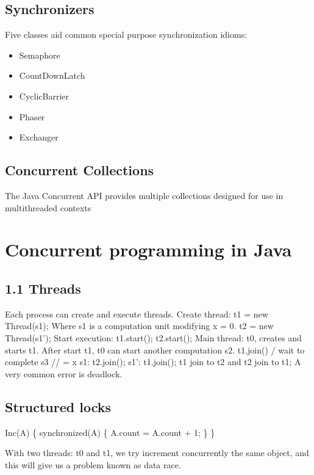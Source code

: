 \documentclass[openany, a4paper]{book}
\theoremstyle{break}
\theoremstyle{example}
\theoremstyle{note}
\theoremstyle{break}
\theoremstyle{exercise}
\begin{document}
\section{Synchronizers}
\label{sec:org6d54f78}

Five classes aid common special purpose synchronization idioms:

\begin{itemize}
\item Semaphore
\item CountDownLatch
\item CyclicBarrier
\item Phaser
\item Exchanger
\end{itemize}

\section{Concurrent Collections}
\label{sec:org3882d62}

The Java Concurrent API provides multiple collections designed for use in
multithreaded contexts


\chapter{Concurrent programming in Java}
\label{sec:org709268f}

\section{1.1 Threads}
\label{sec:org885425f}
Each process can create and execute threads.
Create thread: t1 = new Thread(s1); Where s1 is a computation unit modifying x
= 0.
t2 = new Thread(s1');
Start execution: t1.start(); t2.start();
Main thread: t0, creates and starts t1. After start t1, t0 can start another
computation s2.
t1.join() / wait to complete
s3 // = x
s1: t2.join();
s1': t1.join();
t1 join to t2 and t2 join to t1;
A very common error is deadlock.

\section{Structured locks}
\label{sec:org769ddf0}

Inc(A) \{
  synchronized(A) \{
    A.count = A.count + 1;
  \}
\}

With two threads: t0 and t1, we try increment concurrently the same object,
and this will give us a problem known as data race.
\end{document}
